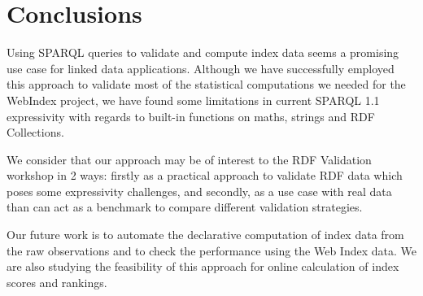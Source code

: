 \section{Conclusions}

Using SPARQL queries to validate and compute index data seems a promising use
case for linked data applications. 
Although we have successfully employed this approach to validate most of the
statistical computations we needed for the WebIndex project, we have found some
limitations in current SPARQL 1.1 expressivity with regards to built-in
functions on maths, strings and RDF Collections.

We consider that our approach may be of interest to the RDF Validation 
 workshop in 2 ways: firstly as a practical approach to validate RDF data
 which poses some expressivity challenges, and secondly, as a 
 use case with real data than can act as a benchmark to compare different
 validation strategies.

Our future work is to automate the declarative computation of index data
 from the raw observations and to check the performance using
 the Web Index data. 
We are also studying the feasibility of this approach 
 for online calculation of index scores and rankings. 
